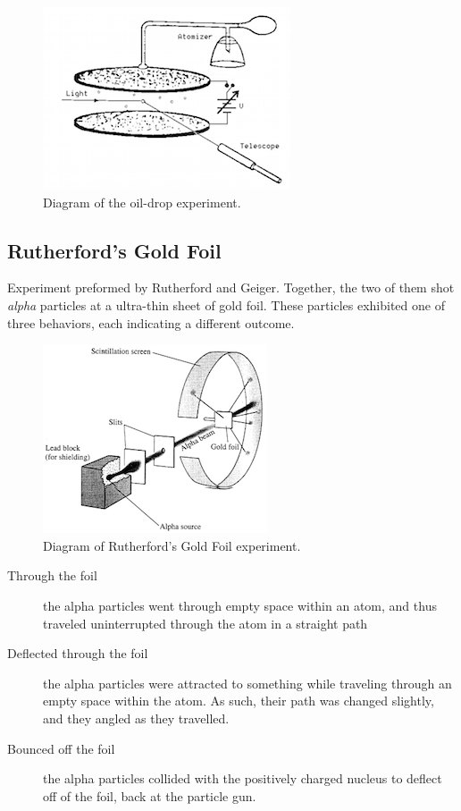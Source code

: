 \begin{figure}[H]
  \centering
  \includegraphics{res/oil_drop_experiment.png}
  \caption{Diagram of the oil-drop experiment.}
\end{figure}

\subsection{Rutherford's Gold Foil}
Experiment preformed by Rutherford and Geiger.  Together, the two of them shot
\textit{alpha} particles at a ultra-thin sheet of gold foil.  These particles
exhibited one of three behaviors, each indicating a different outcome.

\begin{figure}[H]
  \centering
  \includegraphics{res/rutherford_exp.png}
  \caption{Diagram of Rutherford's Gold Foil experiment.}
\end{figure}

\begin{description}
  \item[Through the foil] the alpha particles went through empty space within an
    atom, and thus traveled uninterrupted through the atom in a straight path
  \item[Deflected through the foil] the alpha particles were attracted to
    something while traveling through an empty space within the atom.  As such,
    their path was changed slightly, and they angled as they travelled.
  \item[Bounced off the foil] the alpha particles collided with the positively
    charged nucleus to deflect off of the foil, back at the particle gun.
\end{description}

